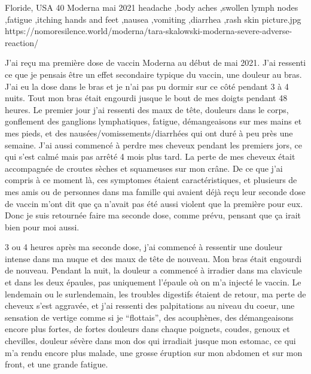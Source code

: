           {Floride, USA}
          {40}
          {Moderna}
          {mai 2021}
          {headache
            ,body aches
            ,swollen lymph nodes
            ,fatigue
            ,itching hands and feet
            ,nausea
            ,vomiting
            ,diarrhea
            ,rash skin
          }
          {picture.jpg}
          {https://nomoresilence.world/moderna/tara-skalowski-moderna-severe-adverse-reaction/}
          {

\normalsize

J'ai reçu ma première dose de vaccin Moderna au début de mai 2021. J'ai ressenti
ce que je pensais être un effet secondaire typique du vaccin, une douleur au
bras. J'ai eu la dose dans le bras et je n'ai pas pu dormir sur ce côté pendant
3 à 4 nuits. Tout mon bras était engourdi jusque le bout de mes doigts pendant
48 heures. Le premier jour j'ai ressenti des maux de tête, douleurs dans le
corps, gonflement des ganglions lymphatiques, fatigue, démangeaisons sur mes
mains et mes pieds, et des nausées/vomissements/diarrhées qui ont duré à peu
près une semaine. J'ai aussi commencé à perdre mes cheveux pendant les premiers
jors, ce qui s'est calmé mais pas arrêté 4 mois plus tard. La perte de mes
cheveux était accompagnée de croutes sèches et squameuses sur mon crâne. De ce
que j'ai compris à ce moment là, ces symptomes étaient caractéristiques, et
plusieurs de mes amis ou de personnes dans ma famille qui avaient déjà reçu leur
seconde dose de vaccin m'ont dit que ça n'avait pas été aussi violent que la
première pour eux. Donc je suis retournée faire ma seconde dose, comme prévu,
pensant que ça irait bien pour moi aussi.

3 ou 4 heures après ma seconde dose, j'ai commencé à ressentir une douleur
intense dans ma nuque et des maux de tête de nouveau. Mon bras était engourdi de
nouveau. Pendant la nuit, la douleur a commencé à irradier dans ma clavicule et
dans les deux épaules, pas uniquement l'épaule où on m'a injecté le vaccin. Le
lendemain ou le surlendemain, les troubles digestifs étaient de retour, ma perte
de cheveux s'est aggravée, et j'ai ressenti des palpitations au niveau du coeur,
une sensation de vertige comme si je “flottais”, des acouphènes, des
démangeaisons encore plus fortes, de fortes douleurs dans chaque poignets,
coudes, genoux et chevilles, douleur sévère dans mon dos qui irradiait jusque
mon estomac, ce qui m'a rendu encore plus malade, une grosse éruption sur mon
abdomen et sur mon front, et une grande fatigue.

}
